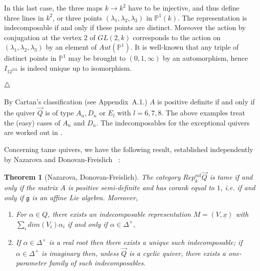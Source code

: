 \documentclass[a4paper,10pt]{amsart}
\def\endexample{$\hfill \triangle$}
\def\a{\alpha}
\def\g{\mathfrak{g}}
\newtheorem{theo}{\bf{Theorem}}[section]
\numberwithin{equation}{section}
\begin{document}
\vspace{.35in}

In this last case, the three maps $k \to k^2$ have to be injective, and thus define three lines in $k^2$, or three points $(\lambda_1, \lambda_2, \lambda_3)$ in $\mathbb{P}^1(k)$. The representation is indecomposable if and only if these points are distinct. Moreover the action by conjugation at the vertex $2$ of $GL(2,k)$ corresponds to the action on $(\lambda_1, \lambda_2, \lambda_3)$ by an element of ${Aut}(\mathbb{P}^1)$. It is well-known that any triple of distinct points in $\mathbb{P}^1$ may be brought to $(0,1,\infty)$ by an automorphism, hence $I_{12^234}$ is indeed unique up to isomorphism.

 \endexample

\vspace{.2in}

By Cartan's classification (see Appendix~A.1.) $A$ is positive definite if and only if the quiver $\vec{Q}$ is of type $A_n, D_n$ or $E_l$ with $l=6,7,8$. The above examples treat the (easy) cases of $A_n$ and $D_n$. The indecomposables for the exceptional  quivers are worked out in \cite{RingelTame}.


\vspace{.2in}

Concerning tame quivers, we have the following result, established independently by Nazarova \cite{Nazarova} and Donovan-Freislich \cite{DF}~:

\vspace{.1in}

\begin{theo}[Nazarova, Donovan-Freislich]\label{T:Godknows} The category $Rep^{nil}_k\vec{Q}$ is tame if and only if the matrix $A$ is positive semi-definite and has corank equal to $1$, i.e. if and only if $\g$ is an affine Lie algebra. Moreover,
\begin{enumerate}
\item[i)] For $\a \in Q$, there exists an indecomposable representation $M=(V,\underline{x})$ with
$\sum_i {dim}(V_i)\a_i$ if and only if $\a \in \Delta^+$,
\item[ii)] If $\a \in \Delta^+$ is a real root then there exists a unique such indecomposable; if $\a \in \Delta^+$ is imaginary then, unless $\vec{Q}$ is a cyclic quiver, there exists a one-parameter family of such indecomposables.
\end{enumerate}
\end{theo}

\vspace{.15in}
\end{document}
